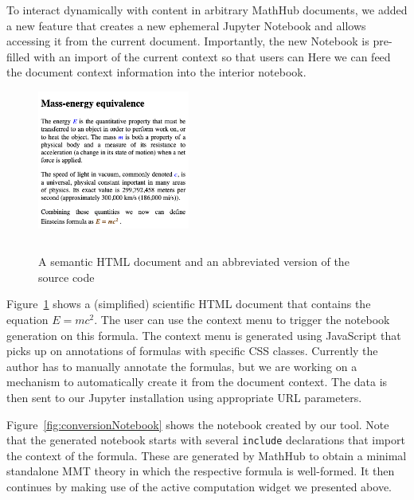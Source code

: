 To interact dynamically with content in arbitrary MathHub documents, we added a new feature that creates a new ephemeral Jupyter Notebook and allows accessing it from the current document.
Importantly, the new Notebook is pre-filled with an import of the current context so that users can Here we can feed the document context information into the interior notebook.

\begin{figure}[h]
  \begin{minipage}[c]{5cm}\includegraphics[width=5cm]{screenshots/sciencedoc}\end{minipage}
  \begin{minipage}[c]{6cm}
    
    \begin{lstlisting}
    \end{lstlisting}
  \end{minipage}
  \caption{A semantic HTML document and an abbreviated version of the source code}\label{fig:conversionHTML}
\end{figure}


Figure~\ref{fig:conversionHTML} shows a (simplified) scientific HTML document that contains the equation $E=mc^2$.
The user can use the context menu to trigger the notebook generation on this formula.
The context menu is generated using JavaScript that picks up on annotations of formulas with specific CSS classes.
Currently the author has to manually annotate the formulas, but we are working on a mechanism to automatically create it from the document context.
The data is then sent to our Jupyter installation using appropriate URL parameters. 

Figure~\ref{fig:conversionNotebook} shows the notebook created by our tool.
Note that the generated notebook starts with several \texttt{include} declarations that import the context of the formula.
These are generated by MathHub to obtain a minimal standalone MMT theory in which the respective formula is well-formed. 
It then continues by making use of the active computation widget we presented above. 

